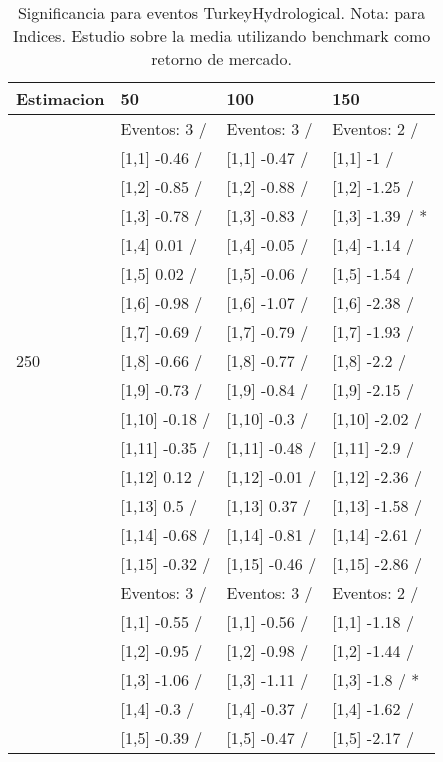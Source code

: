 \begin{table}

\caption{Significancia para eventos TurkeyHydrological. Nota: para Indices. Estudio sobre la media utilizando benchmark como retorno de mercado.}
\centering
\begin{tabular}[t]{llll}
\toprule
Estimacion & 50 & 100 & 150\\
\midrule
 & Eventos:  3 / & Eventos:  3 / & Eventos:  2 /\\
 & {}[1,1] -0.46  / & {}[1,1] -0.47  / & {}[1,1] -1  /\\
 & {}[1,2] -0.85  / & {}[1,2] -0.88  / & {}[1,2] -1.25  /\\
 & {}[1,3] -0.78  / & {}[1,3] -0.83  / & {}[1,3] -1.39  / *\\
 & {}[1,4] 0.01  / & {}[1,4] -0.05  / & {}[1,4] -1.14  /\\
\addlinespace
 & {}[1,5] 0.02  / & {}[1,5] -0.06  / & {}[1,5] -1.54  /\\
 & {}[1,6] -0.98  / & {}[1,6] -1.07  / & {}[1,6] -2.38  /\\
 & {}[1,7] -0.69  / & {}[1,7] -0.79  / & {}[1,7] -1.93  /\\
250 & {}[1,8] -0.66  / & {}[1,8] -0.77  / & {}[1,8] -2.2  /\\
 & {}[1,9] -0.73  / & {}[1,9] -0.84  / & {}[1,9] -2.15  /\\
\addlinespace
 & {}[1,10] -0.18  / & {}[1,10] -0.3  / & {}[1,10] -2.02  /\\
 & {}[1,11] -0.35  / & {}[1,11] -0.48  / & {}[1,11] -2.9  /\\
 & {}[1,12] 0.12  / & {}[1,12] -0.01  / & {}[1,12] -2.36  /\\
 & {}[1,13] 0.5  / & {}[1,13] 0.37  / & {}[1,13] -1.58  /\\
 & {}[1,14] -0.68  / & {}[1,14] -0.81  / & {}[1,14] -2.61  /\\
\addlinespace
 & {}[1,15] -0.32  / & {}[1,15] -0.46  / & {}[1,15] -2.86  /\\
 & Eventos:  3 / & Eventos:  3 / & Eventos:  2 /\\
 & {}[1,1] -0.55  / & {}[1,1] -0.56  / & {}[1,1] -1.18  /\\
 & {}[1,2] -0.95  / & {}[1,2] -0.98  / & {}[1,2] -1.44  /\\
 & {}[1,3] -1.06  / & {}[1,3] -1.11  / & {}[1,3] -1.8  / *\\
\addlinespace
 & {}[1,4] -0.3  / & {}[1,4] -0.37  / & {}[1,4] -1.62  /\\
 & {}[1,5] -0.39  / & {}[1,5] -0.47  / & {}[1,5] -2.17  /\\

\end{tabular}
\end{table}
